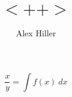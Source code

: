 \documentclass{article}
\author{Alex Hiller}
\title{$<++>$}
\begin{document}
\[ \frac{x}{y} = \int f(x) \ dx \]
\end{document}
